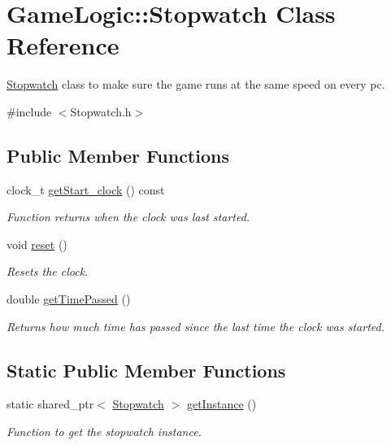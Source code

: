 \hypertarget{classGameLogic_1_1Stopwatch}{}\section{Game\+Logic\+:\+:Stopwatch Class Reference}
\label{classGameLogic_1_1Stopwatch}


\hyperlink{classGameLogic_1_1Stopwatch}{Stopwatch} class to make sure the game runs at the same speed on every pc.  




{\ttfamily \#include $<$Stopwatch.\+h$>$}

\subsection*{Public Member Functions}
\begin{DoxyCompactItemize}
\item 
clock\+\_\+t \hyperlink{classGameLogic_1_1Stopwatch_a630ec6e48b90673127a033d18dd4d570}{get\+Start\+\_\+clock} () const
\begin{DoxyCompactList}\small\item\em Function returns when the clock was last started. \end{DoxyCompactList}\item 
void \hyperlink{classGameLogic_1_1Stopwatch_a8490b96964e128c93be7133e7a5386a5}{reset} ()
\begin{DoxyCompactList}\small\item\em Resets the clock. \end{DoxyCompactList}\item 
double \hyperlink{classGameLogic_1_1Stopwatch_a71ca51fb998fd7c16a64bf6f13ce8faa}{get\+Time\+Passed} ()
\begin{DoxyCompactList}\small\item\em Returns how much time has passed since the last time the clock was started. \end{DoxyCompactList}\end{DoxyCompactItemize}
\subsection*{Static Public Member Functions}
\begin{DoxyCompactItemize}
\item 
static shared\+\_\+ptr$<$ \hyperlink{classGameLogic_1_1Stopwatch}{Stopwatch} $>$ \hyperlink{classGameLogic_1_1Stopwatch_aaca0b7d8b21eb26ed2acb4cbd63fe208}{get\+Instance} ()
\begin{DoxyCompactList}\small\item\em Function to get the stopwatch instance. \end{DoxyCompactList}\end{DoxyCompactItemize}



